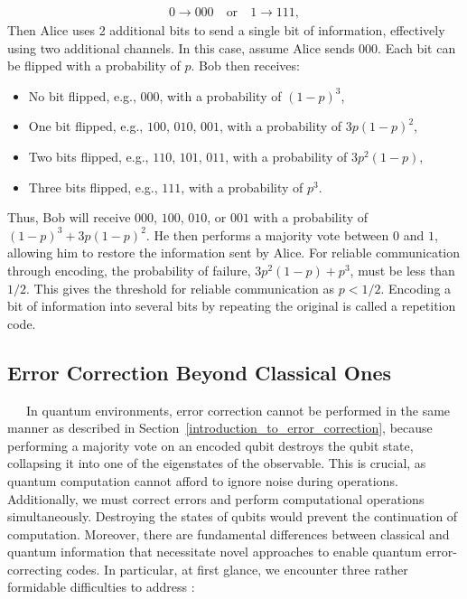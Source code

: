 \documentclass[a4paper,11pt]{ltjsarticle}
\begin{document}
{{        \begin{align}
            0 \rightarrow 000 \quad \text{or} \quad 1 \rightarrow 111,
        \end{align}      
        Then Alice uses 2 additional bits to send a single bit of information, effectively using two additional channels. In this case, assume Alice sends $000$. Each bit can be flipped with a probability of $p$. Bob then receives:
        \begin{itemize}
            \item No bit flipped, e.g., $000$, with a probability of $(1-p)^3$,
            \item One bit flipped, e.g., $100$, $010$, $001$, with a probability of $3p(1-p)^2$,
            \item Two bits flipped, e.g., $110$, $101$, $011$, with a probability of $3p^2(1-p)$,
            \item Three bits flipped, e.g., $111$, with a probability of $p^3$.
        \end{itemize}
        Thus, Bob will receive $000$, $100$, $010$, or $001$ with a probability of $(1-p)^3 + 3p(1-p)^2$. He then performs a majority vote between $0$ and $1$, allowing him to restore the information sent by Alice. For reliable communication through encoding, the probability of failure, $3p^2(1-p) + p^3$, must be less than $1/2$. This gives the threshold for reliable communication as $p < 1/2$. Encoding a bit of information into several bits by repeating the original is called a repetition code.

        \subsection{Error Correction Beyond Classical Ones}\label{repetition_code}{
            \ \ \ In quantum environments, error correction cannot be performed in the same manner as described in Section~\ref{introduction_to_error_correction}, because performing a majority vote on an encoded qubit destroys the qubit state, collapsing it into one of the eigenstates of the observable. This is crucial, as quantum computation cannot afford to ignore noise during operations. Additionally, we must correct errors and perform computational operations simultaneously. Destroying the states of qubits would prevent the continuation of computation. Moreover, there are fundamental differences between classical and quantum information that necessitate novel approaches to enable quantum error-correcting codes. In particular, at first glance, we encounter three rather formidable difficulties to address \cite{nielsen2010}:

}}}
\end{document}
